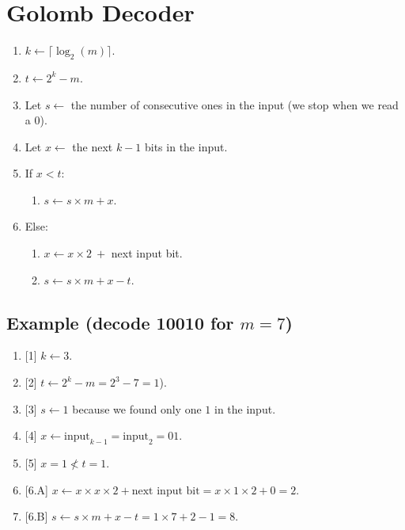 \section{Golomb Decoder}
\begin{enumerate}
\def\labelenumi{\arabic{enumi}.}
\tightlist
\item
  \(k\leftarrow\lceil\log_2(m)\rceil\).
\item
  \(t\leftarrow 2^k-m\).
\item
  Let \(s\leftarrow\) the number of consecutive ones in the input (we
  stop when we read a \(0\)).
\item
  Let \(x\leftarrow\) the next \(k-1\) bits in the input.
\item
  If \(x<t\):
  \begin{enumerate}
  \def\labelenumii{\arabic{enumii}.}
  \tightlist
  \item
    \(s\leftarrow s\times m+x\).
  \end{enumerate}
\item
  Else:
  \begin{enumerate}
  \def\labelenumii{\arabic{enumii}.}
  \tightlist
  \item
    \(x\leftarrow x\times 2~+\) next input bit.
  \item
    \(s\leftarrow s\times m+x-t\).
  \end{enumerate}
\end{enumerate}

\subsection{Example (decode 10010 for $m=7$)}
\begin{enumerate}
\def\labelenumi{\arabic{enumi}.}
\tightlist
\item
  {[}1{]} \(k\leftarrow 3\).
\item
  {[}2{]} \(t\leftarrow 2^k-m = 2^3-7=1\)).
\item
  {[}3{]} \(s\leftarrow 1\) because we found only one \(1\) in the
  input.
\item
  {[}4{]} \(x\leftarrow \text{input}_{k-1} = \text{input}_2 = 01\).
\item
  {[}5{]} \(x=1\nless t=1\).
\item
  {[}6.A{]}
  \(x\leftarrow x\times x\times 2+\text{next input bit} = x\times 1\times 2+0 = 2\).
\item
  {[}6.B{]} \(s\leftarrow s\times m+x-t = 1\times 7+2-1=8\).
\end{enumerate}


